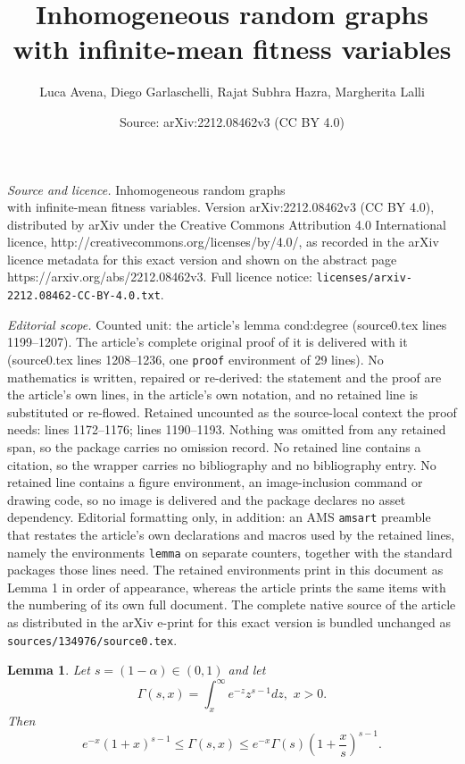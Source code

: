 \documentclass[10pt,a4paper]{amsart}
\title{Inhomogeneous random graphs \\ with infinite-mean fitness variables}
\author{Luca Avena, Diego Garlaschelli, Rajat Subhra Hazra, Margherita Lalli}
\date{Source: arXiv:2212.08462v3 (CC BY 4.0)}
\newtheorem{lemma}{Lemma}
\begin{document}
\maketitle

\noindent\emph{Source and licence.} Inhomogeneous random graphs \\ with infinite-mean fitness variables. Version arXiv:2212.08462v3 (CC BY 4.0), distributed by arXiv under the Creative Commons Attribution 4.0 International licence, http://creativecommons.org/licenses/by/4.0/, as recorded in the arXiv licence metadata for this exact version and shown on the abstract page https://arxiv.org/abs/2212.08462v3. Full licence notice: \texttt{licenses/arxiv-2212.08462-CC-BY-4.0.txt}.\par\smallskip

\noindent\textit{Editorial scope.} Counted unit: the article's lemma cond:degree (source0.tex lines 1199--1207). The article's complete original proof of it is delivered with it (source0.tex lines 1208--1236, one \texttt{proof} environment of 29 lines). No mathematics is written, repaired or re-derived: the statement and the proof are the article's own lines, in the article's own notation, and no retained line is substituted or re-flowed.  Retained uncounted as the source-local context the proof needs: lines 1172--1176; lines 1190--1193.  Nothing was omitted from any retained span, so the package carries no omission record.  No retained line contains a citation, so the wrapper carries no bibliography and no bibliography entry.  No retained line contains a figure environment, an image-inclusion command or drawing code, so no image is delivered and the package declares no asset dependency.  Editorial formatting only, in addition: an AMS \texttt{amsart} preamble that restates the article's own declarations and macros used by the retained lines, namely the environments \texttt{lemma} on separate counters, together with the standard packages those lines need.  The retained environments print in this document as Lemma 1 in order of appearance, whereas the article prints the same items with the numbering of its own full document.  The complete native source of the article as distributed in the arXiv e-print for this exact version is bundled unchanged as \texttt{sources/134976/source0.tex}.
\begin{lemma}\label{lemma:incompletegamma}
Let $s=(1-\alpha)\in (0,1)$ and let
$$\Gamma(s, x)= \int_x^\infty e^{-z}z^{s-1}dz, \, \, x>0.$$ Then
$$e^{-x} (1+x)^{s-1}\le \Gamma(s,x) \le e^{-x}\Gamma(s) \left(1+\frac{x}{s}\right)^{s-1}.$$
\end{lemma}
\end{document}
